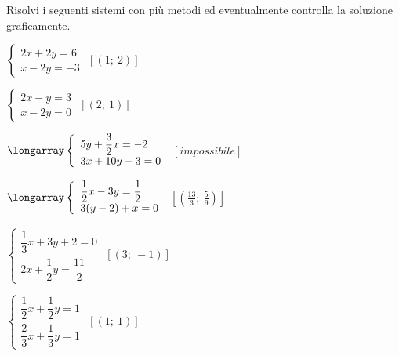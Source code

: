 \begin{esercizio}[\Ast]
 \label{ese:22.71}
 Risolvi i seguenti sistemi con più metodi ed eventualmente controlla
la soluzione graficamente.
\begin{multicols}{2}
\begin{enumeratea}
\item \(\left\{\begin{array}{l}{2x+2y=6}\\{x-2y=-3}\end{array}\right.\)
 \hfill \(\left[(1;~2)\right]\)
\item \(\left\{\begin{array}{l}{2x-y=3}\\{x-2y=0}\end{array}\right.\)
 \hfill \(\left[(2;~1)\right]\)
\item \(\longarray\left\{\begin{array}{l}5y+\dfrac{3}{2}x=-2\\3x+10y-3=0 
\end{array}\right.\)
 \hfill \(\left[impossibile\right]\)
\item 
\(\longarray\left\{\begin{array}{l}\dfrac{1}{2}x-3y=\dfrac{1}{2}\\3(y-2)+x=0 
\end{array}\right.\)
 \hfill \(\left[\left(\frac{13}{3};~\frac{5}{9}\right)\right]\)
\item 
\(\left\{\begin{array}{l}{\dfrac{1}{3}x+3y+2=0}\\{2x+\dfrac{1}{2}y=\dfrac{11}{2}}
\end{array}\right.\)
 \hfill \(\left[(3;~-1)\right]\)
\item 
\(\left\{\begin{array}{l}{\dfrac{1}{2}x+\dfrac{1}{2}y=1}\\{\dfrac{2}{3}x+\dfrac{1
}{3}y=1}\end{array}\right.\)
 \hfill \(\left[(1;~1)\right]\)
 {\longarray
}
\end{enumeratea}
\end{multicols}
\end{esercizio}
